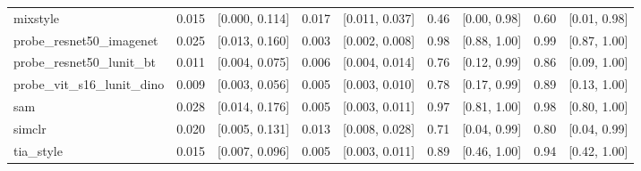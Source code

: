 \begin{tabular}{lrrrrrrrr}
mixstyle & 0.015 & [0.000, 0.114] & 0.017 & [0.011, 0.037] & 0.46 & [0.00, 0.98] & 0.60 & [0.01, 0.98] \\
probe\_resnet50\_imagenet & 0.025 & [0.013, 0.160] & 0.003 & [0.002, 0.008] & 0.98 & [0.88, 1.00] & 0.99 & [0.87, 1.00] \\
probe\_resnet50\_lunit\_bt & 0.011 & [0.004, 0.075] & 0.006 & [0.004, 0.014] & 0.76 & [0.12, 0.99] & 0.86 & [0.09, 1.00] \\
probe\_vit\_s16\_lunit\_dino & 0.009 & [0.003, 0.056] & 0.005 & [0.003, 0.010] & 0.78 & [0.17, 0.99] & 0.89 & [0.13, 1.00] \\
sam & 0.028 & [0.014, 0.176] & 0.005 & [0.003, 0.011] & 0.97 & [0.81, 1.00] & 0.98 & [0.80, 1.00] \\
simclr & 0.020 & [0.005, 0.131] & 0.013 & [0.008, 0.028] & 0.71 & [0.04, 0.99] & 0.80 & [0.04, 0.99] \\
tia\_style & 0.015 & [0.007, 0.096] & 0.005 & [0.003, 0.011] & 0.89 & [0.46, 1.00] & 0.94 & [0.42, 1.00] \\
\bottomrule
\end{tabular}
